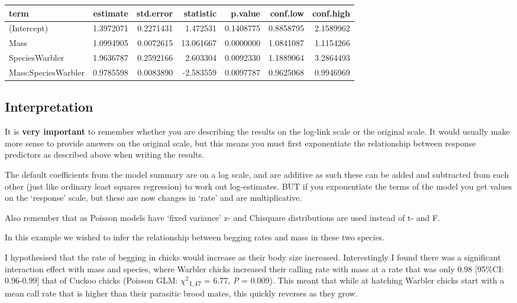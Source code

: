 \documentclass[
]{book}
\makeatletter
\newenvironment{kframe}{%
\medskip{}
\setlength{\fboxsep}{.8em}
 \def\at@end@of@kframe{}%
 \ifinner\ifhmode%
  \def\at@end@of@kframe{\end{minipage}}%
  \begin{minipage}{\columnwidth}%
 \fi\fi%
 \def\FrameCommand##1{\hskip\@totalleftmargin \hskip-\fboxsep
 \colorbox{shadecolor}{##1}\hskip-\fboxsep
     \hskip-\linewidth \hskip-\@totalleftmargin \hskip\columnwidth}%
 \MakeFramed {\advance\hsize-\width
   \@totalleftmargin\z@ \linewidth\hsize
   \@setminipage}}%
 {\par\unskip\endMakeFramed%
 \at@end@of@kframe}
\newenvironment{block}[1]
  {
  \begin{itemize}
  \renewcommand{\labelitemi}{
    \raisebox{-.7\height}[0pt][0pt]{
      {\setkeys{Gin}{width=3em,keepaspectratio}\texttt{[image: images/\#1]}}
    }
  }
  \setlength{\fboxsep}{1em}
  \begin{kframe}
  \item
  }
  {
  \end{kframe}
  \end{itemize}
  }
\newenvironment{rmdwarning}
  {\begin{block}{warning}}
  {\end{block}}
\makeatother
\begin{document}
\begin{table}[H]
\centering
\begin{tabular}[t]{l|r|r|r|r|r|r}
\hline
term & estimate & std.error & statistic & p.value & conf.low & conf.high\\
\hline
(Intercept) & 1.3972071 & 0.2271431 & 1.472531 & 0.1408775 & 0.8858795 & 2.1589962\\
\hline
Mass & 1.0994905 & 0.0072615 & 13.061667 & 0.0000000 & 1.0841087 & 1.1154266\\
\hline
SpeciesWarbler & 1.9636787 & 0.2592166 & 2.603304 & 0.0092330 & 1.1889064 & 3.2864493\\
\hline
Mass:SpeciesWarbler & 0.9785598 & 0.0083890 & -2.583559 & 0.0097787 & 0.9625068 & 0.9946969\\
\hline
\end{tabular}
\end{table}

\hypertarget{interpretation}{%
\subsection{Interpretation}\label{interpretation}}

It is \textbf{very important} to remember whether you are describing the results on the log-link scale or the original scale. It would usually make more sense to provide answers on the original scale, but this means you must first exponentiate the relationship between response predictors as described above when writing the results.

\begin{rmdwarning}
The default coefficients from the model summary are on a log scale, and
are additive as such these can be added and subtracted from each other
(just like ordinary least squares regression) to work out log-estimates.
BUT if you exponentiate the terms of the model you get values on the
`response' scale, but these are now changes in `rate' and are
multiplicative.

Also remember that as Poisson models have `fixed variance' z- and
Chisquare distributions are used instead of t- and F.
\end{rmdwarning}

In this example we wished to infer the relationship between begging rates and mass in these two species.

I hypothesised that the rate of begging in chicks would increase as their body size increased. Interestingly I found there was a significant interaction effect with mass and species, where Warbler chicks increased their calling rate with mass at a rate that was only 0.98 {[}95\%CI: 0.96-0.99{]} that of Cuckoo chicks (Poisson GLM: \(\chi^2\)\textsubscript{1,47} = 6.77, \emph{P} = 0.009). This meant that while at hatching Warbler chicks start with a mean call rate that is higher than their parasitic brood mates, this quickly reverses as they grow.
\end{document}

